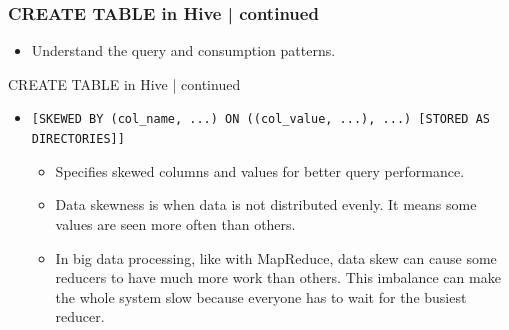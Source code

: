 \begin{frame}[fragile]
\frametitle{CREATE TABLE in Hive | continued}    
\vspace{-0.5cm}		
\begin{tcolorbox}[colback=white,colframe=black,title= Part 9: Clustering and Sorting | Conclusion]
		\begin{itemize}
			\item Understand the query and consumption patterns.
		\end{itemize}
\end{tcolorbox}
\end{frame}
\begin{frame}{CREATE TABLE in Hive | continued}
	\begin{tcolorbox}[colback=white,colframe=black,title= Part 10: Data Skewing]
		\small
	\begin{itemize}
	  \item \texttt{[SKEWED BY (col\_name, ...) ON ((col\_value, ...), ...) [STORED AS DIRECTORIES]]}
	  \begin{itemize}
		\item Specifies skewed columns and values for better query performance.
		\item Data skewness is when data is not distributed evenly. It means some values are seen more often than others.
		\item In big data processing, like with MapReduce, data skew can cause some reducers to have much more work than others. This imbalance can make the whole system slow because everyone has to wait for the busiest reducer.
	  \end{itemize}
	\end{itemize}
	\end{tcolorbox}
  \end{frame}
  

